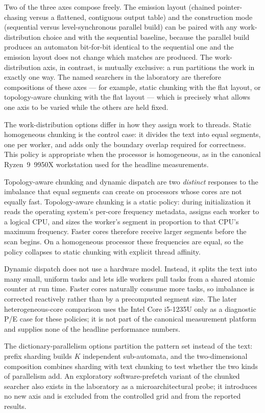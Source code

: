 Two of the three axes compose freely. The emission layout (chained
pointer-chasing versus a flattened, contiguous output table) and the
construction mode (sequential versus level-synchronous parallel build) can be
paired with any work-distribution choice and with the sequential baseline,
because the parallel build produces an automaton bit-for-bit identical to the
sequential one and the emission layout does not change which matches are
produced. The work-distribution axis, in contrast, is mutually exclusive: a run
partitions the work in exactly one way. The named searchers in the laboratory
are therefore compositions of these axes --- for example, static chunking with
the flat layout, or topology-aware chunking with the flat layout --- which is
precisely what allows one axis to be varied while the others are held fixed.

The work-distribution options differ in how they assign work to threads.
Static homogeneous chunking is the control case: it divides the text into equal
segments, one per worker, and adds only the boundary overlap required for
correctness. This policy is appropriate when the processor is homogeneous, as in
the canonical Ryzen~9~9950X workstation used for the headline measurements.

Topology-aware chunking and dynamic dispatch are two \textit{distinct} responses
to the imbalance that equal segments can create on processors whose cores are
not equally fast. Topology-aware chunking is a static policy: during
initialization it reads the operating system's per-core frequency metadata,
assigns each worker to a logical CPU, and sizes the worker's segment in
proportion to that CPU's maximum frequency. Faster cores therefore receive
larger segments before the scan begins. On a homogeneous processor these
frequencies are equal, so the policy collapses to static chunking with explicit
thread affinity.

Dynamic dispatch does not use a hardware model. Instead, it splits the text into
many small, uniform tasks and lets idle workers pull tasks from a shared atomic
counter at run time. Faster cores naturally consume more tasks, so imbalance is
corrected reactively rather than by a precomputed segment size. The later
heterogeneous-core comparison uses the Intel Core i5-1235U only as a diagnostic
P/E case for these policies; it is not part of the canonical measurement
platform and supplies none of the headline performance numbers.

The dictionary-parallelism options partition the pattern set instead of the
text: prefix sharding builds $K$ independent sub-automata, and the
two-dimensional composition combines sharding with text chunking to test whether
the two kinds of parallelism add. An exploratory software-prefetch variant of
the chunked searcher also exists in the laboratory as a microarchitectural
probe; it introduces no new axis and is excluded from the controlled grid and
from the reported results.

